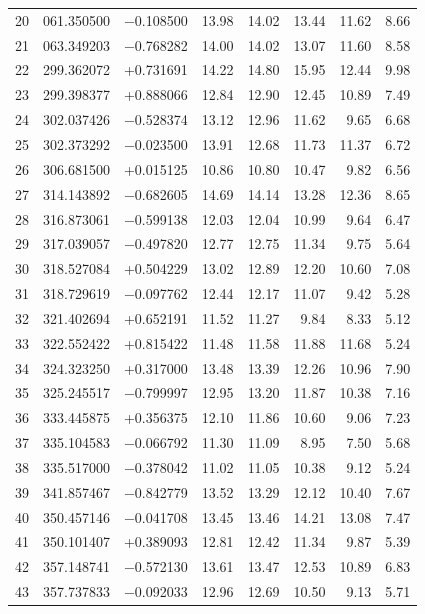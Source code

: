 \documentclass[times,usenatbib]{mn2e}
\begin{document}
\begin{table}
\begin{center}
\begin{tabular}{lccrrrrr}
20 & 061.350500 & $-$0.108500 & 13.98 & 14.02 & 13.44 & 11.62 & 8.66 \\
21 & 063.349203 & $-$0.768282 & 14.00 & 14.02 & 13.07 & 11.60 & 8.58 \\
22 & 299.362072 & +0.731691 & 14.22 & 14.80 & 15.95 & 12.44 & 9.98 \\
23 & 299.398377 & +0.888066 & 12.84 & 12.90 & 12.45 & 10.89 & 7.49 \\
24 & 302.037426 & $-$0.528374 & 13.12 & 12.96 & 11.62 & 9.65 & 6.68 \\
25 & 302.373292 & $-$0.023500 & 13.91 & 12.68 & 11.73 & 11.37 & 6.72 \\
26 & 306.681500 & +0.015125 & 10.86 & 10.80 & 10.47 & 9.82 & 6.56 \\
27 & 314.143892 & $-$0.682605 & 14.69 & 14.14 & 13.28 & 12.36 & 8.65 \\
28 & 316.873061 & $-$0.599138 & 12.03 & 12.04 & 10.99 & 9.64 & 6.47 \\
29 & 317.039057 & $-$0.497820 & 12.77 & 12.75 & 11.34 & 9.75 & 5.64 \\
30 & 318.527084 & +0.504229 & 13.02 & 12.89 & 12.20 & 10.60 & 7.08 \\
31 & 318.729619 & $-$0.097762 & 12.44 & 12.17 & 11.07 & 9.42 & 5.28 \\
32 & 321.402694 & +0.652191 & 11.52 & 11.27 & 9.84 & 8.33 & 5.12 \\
33 & 322.552422 & +0.815422 & 11.48 & 11.58 & 11.88 & 11.68 & 5.24 \\
34 & 324.323250 & +0.317000 & 13.48 & 13.39 & 12.26 & 10.96 & 7.90 \\
35 & 325.245517 & $-$0.799997 & 12.95 & 13.20 & 11.87 & 10.38 & 7.16 \\
36 & 333.445875 & +0.356375 & 12.10 & 11.86 & 10.60 & 9.06 & 7.23 \\
37 & 335.104583 & $-$0.066792 & 11.30 & 11.09 & 8.95 & 7.50 & 5.68 \\
38 & 335.517000 & $-$0.378042 & 11.02 & 11.05 & 10.38 & 9.12 & 5.24 \\
39 & 341.857467 & $-$0.842779 & 13.52 & 13.29 & 12.12 & 10.40 & 7.67 \\
40 & 350.457146 & $-$0.041708 & 13.45 & 13.46 & 14.21 & 13.08 & 7.47 \\
41 & 350.101407 & +0.389093 & 12.81 & 12.42 & 11.34 & 9.87 & 5.39 \\
42 & 357.148741 & $-$0.572130 & 13.61 & 13.47 & 12.53 & 10.89 & 6.83 \\
43 & 357.737833 & $-$0.092033 & 12.96 & 12.69 & 10.50 & 9.13 & 5.71 \\
\hline
\end{tabular}
\end{center}
\label{candidate-catalogue}
\end{table}
\end{document}
